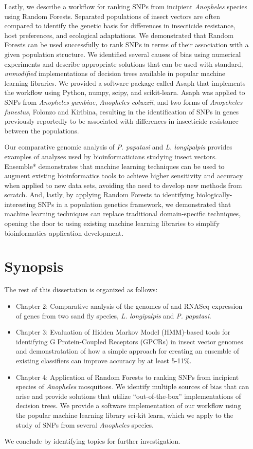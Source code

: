 Lastly, we describe a workflow for ranking SNPs from incipient \emph{Anopheles} species using Random Forests.  Separated populations of insect vectors are often compared to identify the genetic basis for differences in insecticide resistance, host preferences, and ecological adaptations.  We demonstrated that Random Forests can be used successfully to rank SNPs in terms of their association with a given population structure.  We identified several causes of bias using numerical experiments and describe appropriate solutions that can be used with standard, \emph{unmodified} implementations of decision trees available in popular machine learning libraries. We provided a software package called Asaph that implements the workflow using Python, numpy, scipy, and scikit-learn.  Asaph was applied to SNPs from \emph{Anopheles gambiae}, \emph{Anopheles coluzzii}, and two forms of \emph{Anopeheles funestus}, Folonzo and Kiribina, resulting in the identification of SNPs in genes previously reportedly to be associated with differences in insecticide resistance between the populations.

Our comparative genomic analysis of \emph{P. papatasi} and \emph{L. longipalpis} provides examples of analyses used by bioinformaticians studying insect vectors.  Ensemble* demonstrates that machine learning techniques can be used to augment existing bioinformatics tools to achieve higher sensitivity and accuracy when applied to new data sets, avoiding the need to develop new methods from scratch. And, lastly, by applying Random Forests to identifying biologically-interesting SNPs in a population genetics framework, we demonstrated that machine learning techniques can replace traditional domain-specific techniques, opening the door to using existing machine learning libraries to simplify bioinformatics application development.

\section{Synopsis}
The rest of this dissertation is organized as follows:

\begin{itemize}
\item Chapter 2: Comparative analysis of the genomes of and RNASeq expression of genes from two sand fly species, \emph{L. longipalpis} and \emph{P. papatasi}.
\item Chapter 3: Evaluation of Hidden Markov Model (HMM)-based tools for identifying G Protein-Coupled Receptors (GPCRs) in insect vector genomes and demonstratation of how a simple approach for creating an ensemble of existing classifiers can improve accuracy by at least 5-11\%.
\item Chapter 4: Application of Random Forests to ranking SNPs from incipient species of \emph{Anopheles} mosquitoes.  We identify multiple sources of bias that can arise and provide solutions that utilize ``out-of-the-box'' implementations of decision trees.  We provide a software implementation of our workflow using the popular machine learning library sci-kit learn, which we apply to the study of SNPs from several \emph{Anopheles} species.
\end{itemize}

We conclude by identifying topics for further investigation.
